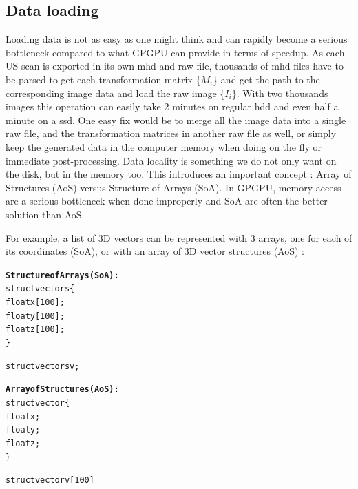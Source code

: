 \documentclass[12pt,journal,compsoc]{IEEEtran}
\begin{document}
\newpage
\subsection{Data loading}

Loading data is not as easy as one might think and can rapidly become a serious bottleneck compared to what GPGPU can provide in terms of speedup. 
As each US scan is exported in its own mhd and raw file, thousands of mhd files have to be parsed to get each transformation matrix \{$M_i$\} and get the path to the corresponding image data and load the raw image \{$I_i$\}.  
With two thousands images this operation can easily take 2 minutes on regular \ac{hdd} and even half a minute on a \ac{ssd}.
One easy fix would be to merge all the image data into a single raw file, and the transformation matrices in another raw file as well, or simply keep the generated data in the computer memory when doing on the fly or immediate post-processing.
Data locality is something we do not only want on the disk, but in the memory too. This introduces an important concept : Array of Structures (AoS) versus Structure of Arrays (SoA). In GPGPU, memory access are a serious bottleneck when done improperly and SoA are often the better solution than AoS. 

For example, a list of 3D vectors can be represented with 3 arrays, one for each of its coordinates (SoA), or with an array of 3D vector structures (AoS) :

\begin{samepage}
\begin{alltt}
\textbf{Structure of Arrays (SoA):}
struct vectors \{
    float x[100];
    float y[100];
    float z[100];
\}

struct vectors v;

\textbf{Array of Structures (AoS):}
struct vector \{
    float x;
    float y;
    float z;
\}

struct vector v[100]
\end{alltt}
\end{samepage}
\end{document}
